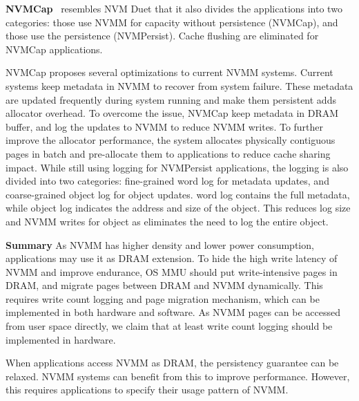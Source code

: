 \textbf{NVMCap}~\cite{NVMCap} resembles NVM Duet that it also divides
the applications into two categories: those use NVMM for capacity without
persistence (NVMCap), and those use the persistence (NVMPersist). Cache flushing
are eliminated for NVMCap applications.
 
NVMCap proposes several optimizations to current NVMM systems.
Current systems keep metadata in NVMM to recover from system failure.
These metadata are updated frequently during system running and make
them persistent adds allocator overhead. To overcome the issue, NVMCap
keep metadata in DRAM buffer, and log the updates to NVMM to reduce NVMM
writes. To further improve the allocator performance, the system allocates
physically contiguous pages in batch and pre-allocate them to applications 
to reduce cache sharing impact. While still using logging for NVMPersist
applications, the logging is also divided into two categories: fine-grained
word log for metadata updates, and coarse-grained object log for object
updates. word log contains the full metadata, while object log indicates
the address and size of the object. This reduces log size and NVMM writes for
object as eliminates the need to log the entire object.

\textbf{Summary} As NVMM has higher density and lower power consumption,
applications may use it as DRAM extension.
To hide the high write latency of NVMM and
improve endurance, OS MMU should put write-intensive pages in DRAM, and migrate
pages between DRAM and NVMM dynamically. This requires write count logging and
page migration mechanism, which can be implemented in both hardware and
software. As NVMM pages can be accessed from user space directly, we claim 
that at least write count logging should be implemented in hardware.

When applications access NVMM as DRAM, the persistency guarantee can be relaxed.
NVMM systems can benefit from this to improve performance. However, this
requires applications to specify their usage pattern of NVMM. 
